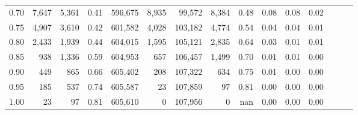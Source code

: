 \begin{tabular}{rrrrrrrrrrrrrrr}
0.70 &    7,647 &   5,361 &  0.41 &  596,675 &    8,935 &   99,572 &    8,384 &  0.48 &  0.08 &  0.08 &      0.02 \\
0.75 &    4,907 &   3,610 &  0.42 &  601,582 &    4,028 &  103,182 &    4,774 &  0.54 &  0.04 &  0.04 &      0.01 \\
0.80 &    2,433 &   1,939 &  0.44 &  604,015 &    1,595 &  105,121 &    2,835 &  0.64 &  0.03 &  0.01 &      0.01 \\
0.85 &      938 &   1,336 &  0.59 &  604,953 &      657 &  106,457 &    1,499 &  0.70 &  0.01 &  0.01 &      0.00 \\
0.90 &      449 &     865 &  0.66 &  605,402 &      208 &  107,322 &      634 &  0.75 &  0.01 &  0.00 &      0.00 \\
0.95 &      185 &     537 &  0.74 &  605,587 &       23 &  107,859 &       97 &  0.81 &  0.00 &  0.00 &      0.00 \\
1.00 &       23 &      97 &  0.81 &  605,610 &        0 &  107,956 &        0 &   nan &  0.00 &  0.00 &      0.00 \\
\bottomrule
\end{tabular}
